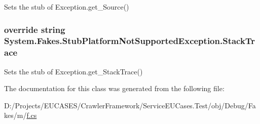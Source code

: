 Sets the stub of Exception.\-get\-\_\-\-Source()

\hypertarget{class_system_1_1_fakes_1_1_stub_platform_not_supported_exception_a8c1c78ac47a5dba46dbffdc1a3d35ce7}{
\subsubsection[{Stack\-Trace}]{\setlength{\rightskip}{0pt plus 5cm}override string System.\-Fakes.\-Stub\-Platform\-Not\-Supported\-Exception.\-Stack\-Trace\hspace{0.3cm}{\ttfamily [get]}}}\label{class_system_1_1_fakes_1_1_stub_platform_not_supported_exception_a8c1c78ac47a5dba46dbffdc1a3d35ce7}


Sets the stub of Exception.\-get\-\_\-\-Stack\-Trace()



The documentation for this class was generated from the following file\-:\begin{DoxyCompactItemize}
\item 
D\-:/\-Projects/\-E\-U\-C\-A\-S\-E\-S/\-Crawler\-Framework/\-Service\-E\-U\-Cases.\-Test/obj/\-Debug/\-Fakes/m/\hyperlink{m_2f_8cs}{f.\-cs}\end{DoxyCompactItemize}

